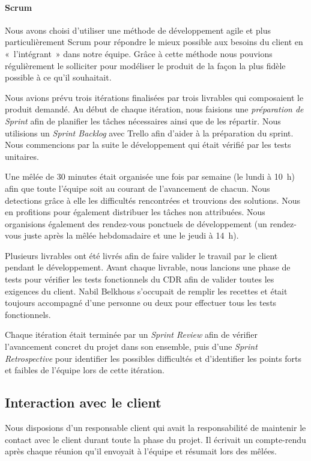 \documentclass[hidelinks, 10pt,a4paper]{article}
\begin{document}
      \paragraph{Scrum}
	Nous avons choisi d'utiliser une méthode de développement agile et plus particulièrement Scrum 
	pour répondre le mieux possible aux besoins du client en «~l'intégrant~» dans notre équipe.
	Grâce à cette méthode nous pouvions régulièrement le solliciter pour modéliser
	le produit de la façon la plus fidèle possible à ce qu'il souhaitait.
	
	Nous avions prévu trois itérations finalisées par trois livrables qui composaient le produit demandé.
	Au début de chaque itération, nous faisions une \emph{préparation de Sprint} afin de planifier
	les tâches nécessaires ainsi que de les répartir. Nous utilisions un \emph{Sprint Backlog} avec Trello
	afin d'aider à la préparation du sprint.
	Nous commencions par la suite le développement qui était vérifié par les tests unitaires.
	
	Une mêlée de 30 minutes était organisée une fois par semaine (le lundi à 10~h) afin que toute
	l'équipe soit au courant de l'avancement de chacun. Nous detections grâce à elle les difficultés rencontrées
	et trouvions des solutions. Nous en profitions pour également distribuer les tâches non attribuées.
	Nous organisions également des rendez-vous ponctuels de développement (un rendez-vous juste après la mêlée hebdomadaire et une le jeudi à 14~h).
	
	Plusieurs livrables ont été livrés afin de faire valider le travail par le client pendant le développement.
	Avant chaque livrable, nous lancions une phase de tests pour vérifier les tests fonctionnels
	du CDR afin de valider toutes les exigences du client.
	Nabil Belkhous s'occupait de remplir les recettes et était toujours accompagné d'une personne ou deux pour effectuer tous les tests fonctionnels.
	
	Chaque itération était terminée par un \emph{Sprint Review}
	afin de vérifier l'avancement concret du projet dans son ensemble, puis d'une \emph{Sprint Retrospective}
	pour identifier les possibles difficultés et d'identifier les points forts et faibles de l'équipe
	lors de cette itération.
	
 \subsection{Interaction avec le client}
    Nous disposions d'un responsable client qui avait la responsabilité de maintenir le contact avec le client
    durant toute la phase du projet. Il écrivait un compte-rendu après chaque réunion qu'il envoyait à l'équipe et résumait lors des mêlées.
    
\end{document}

